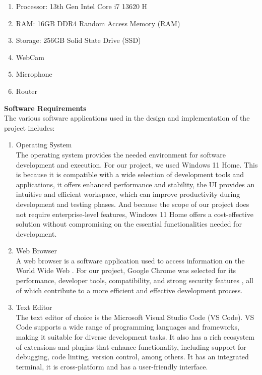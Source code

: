 \documentclass[a4paper,12pt]{article}  %
\begin{document}
\begin{enumerate}
      \item Processor: 13th Gen Intel Core i7 13620 H
      \item RAM: 16GB DDR4 Random Access Memory (RAM)
      \item Storage: 256GB Solid State Drive (SSD)
      \item WebCam
      \item Microphone
      \item Router
\end{enumerate}

\textbf{Software Requirements}\\
The various software applications used in the design and implementation of the project includes:\\
\begin{enumerate}
      \item Operating System\\ The operating system provides the needed environment for
            software development and execution. For our project, we used Windows 11 Home.
            This is because it is compatible with a wide selection of development tools and
            applications, it offers enhanced performance and stability, the UI provides an
            intuitive and efficient workspace, which can improve productivity during
            development and testing phases. And because the scope of our project does not
            require enterprise-level features, Windows 11 Home offers a cost-effective
            solution without compromising on the essential functionalities needed for
            development.

      \item Web Browser\\ A web browser is a software application used to access
            information on the World Wide Web \cite{byjus2024}. For our project, Google
            Chrome was selected for its performance, developer tools, compatibility, and
            strong security features \cite{emmanuel2022design}, all of which contribute to
            a more efficient and effective development process.\\
      \item Text Editor\\ The text editor of choice is the Microsoft Visual Studio Code (VS
            Code). VS Code supports a wide range of programming languages and frameworks,
            making it suitable for diverse development tasks. It also has a rich ecosystem
            of extensions and plugins that enhance functionality, including support for
            debugging, code linting, version control, among others. It has an integrated
            terminal, it is cross-platform and has a user-friendly interface. \\


\end{enumerate}
\end{document}
